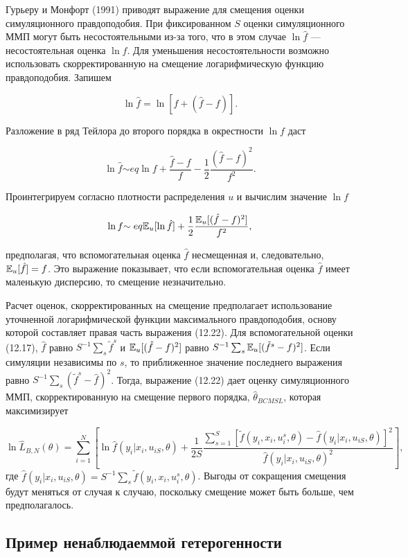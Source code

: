 Гурьеру и Монфорт (1991) приводят выражение для смещения оценки симуляционного правдоподобия. При фиксированном $S$ оценки симуляционного ММП  могут быть несостоятельными из-за того, что в этом случае $\ln \hat{f}$ --- несостоятельная оценка $\ln f$. Для уменьшения несостоятельности возможно использовать скорректированную на смещение логарифмическую функцию правдоподобия. Запишем

\[
\ln\hat{f}=\ln[f+(\hat{f}-f)].
\]

Разложение в ряд Тейлора до второго порядка в окрестности $\ln{f}$ даст

\[
\ln\hat{f} {\sim eq} \ln{f}+\dfrac{\hat{f}-f}{f}-\dfrac{1}{2}\dfrac{(\hat{f}-f)^2}{f^2}.
\]

Проинтегрируем согласно плотности распределения $u$ и вычислим значение $\ln{f}$

\begin{equation}
\ln{f} {\sim eq} \mathbb{E}_{u}[\ln\hat{f}]+\dfrac{1}{2}\dfrac{\mathbb{E}_{u}[(\hat{f}-f)^2]}{f^2},
\end{equation}

предполагая, что вспомогательная оценка $\hat{f}$ несмещенная и, следовательно, $\mathbb{E}_{u}[\hat{f}]=f$. Это выражение показывает, что если вспомогательная оценка $\hat{f}$ имеет маленькую дисперсию, то смещение незначительно.

Расчет оценок, скорректированных на смещение предполагает использование уточненной логарифмической функции максимального правдоподобия, основу которой составляет правая часть выражения (12.22). Для вспомогательной оценки (12.17), $\hat{f}$ равно $S^{-1}\sum_{s}\tilde{f}^{s}$ и $\mathbb{E}_{u}[(\hat{f}-f)^2]$ равно $S^{-1}\sum_{s}\mathbb{E}_{u}[(\tilde{f}^s-f)^2]$. Если симуляции независимы по $s$, то приближенное значение последнего выражения равно $S^{-1}\sum_{s}(\tilde{f}^s-\hat{f})^2$. Тогда, выражение (12.22) дает  оценку симуляционного ММП, скорректированную на смещение первого порядка, $\hat{\theta}_{BCMSL}$, которая максимизирует

\[
\ln\hat{L}_{B,N}(\theta)=\sum^{N}_{i=1}\left[\ln\hat{f}(y_i|x_i,u_{iS},\theta)+\dfrac{1}{2S}\dfrac{\sum^{S}_{s=1}[\tilde{f}(y_i,x_i,u^{s}_{i},\theta)-\hat{f}(y_i|x_i,u_{iS},\theta)]^2}{\hat{f}(y_i|x_i,u_{iS},\theta)^2} \right], 
\]
где $\hat{f}(y_i|x_i,u_{iS},\theta)=S^{-1}\sum_{s}\tilde{f}(y_i,x_i,u^{s}_i,\theta)$. Выгоды от сокращения смещения будут меняться от случая к случаю, поскольку смещение может быть больше, чем предполагалось.

\subsection{Пример ненаблюдаеммой гетерогенности}

